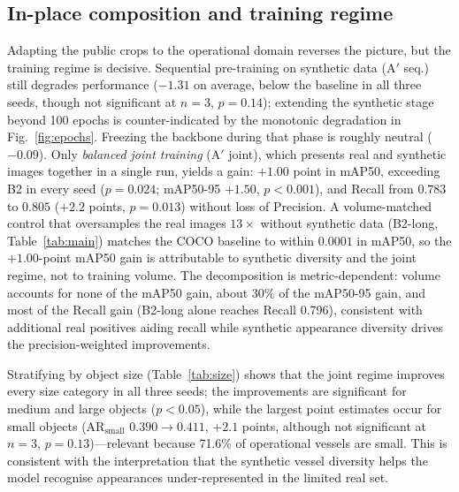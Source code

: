 \documentclass[10pt,conference]{IEEEtran}
\begin{document}
\subsection{In-place composition and training regime}
\label{subsec:inplace}
Adapting the public crops to the operational domain reverses the picture, but the training regime is decisive. Sequential pre-training on synthetic data (A$'$ seq.) still degrades performance ($-1.31$ on average, below the baseline in all three seeds, though not significant at $n{=}3$, $p=0.14$); extending the synthetic stage beyond 100 epochs is counter-indicated by the monotonic degradation in Fig.~\ref{fig:epochs}. Freezing the backbone during that phase is roughly neutral ($-0.09$). Only \emph{balanced joint training} (A$'$ joint), which presents real and synthetic images together in a single run, yields a gain: $+1.00$ point in mAP50, exceeding B2 in every seed ($p=0.024$; mAP50-95 $+1.50$, $p<0.001$), and Recall from $0.783$ to $0.805$ ($+2.2$ points, $p=0.013$) without loss of Precision. 
A volume-matched control that oversamples the real images $13\times$ without synthetic data (B2-long, Table~\ref{tab:main}) matches the COCO baseline to within $0.0001$ in mAP50, so the $+1.00$-point mAP50 gain is attributable to synthetic diversity and the joint regime, not to training volume. The decomposition is metric-dependent: volume accounts for none of the mAP50 gain, about 30\% of the mAP50-95 gain, and most of the Recall gain (B2-long alone reaches Recall 0.796), consistent with additional real positives aiding recall while synthetic appearance diversity drives the precision-weighted improvements.

Stratifying by object size (Table~\ref{tab:size}) shows that the joint regime
improves every size category in all three seeds; the improvements are significant
for medium and large objects ($p<0.05$), while the largest point estimates occur
for small objects ($\text{AR}_\text{small}$ $0.390\!\rightarrow\!0.411$, $+2.1$
points, although not significant at $n{=}3$, $p=0.13$)---relevant because
71.6\% of operational vessels are small. This is consistent with the
interpretation that the synthetic vessel diversity helps the model recognise
appearances under-represented in the limited real set.
\end{document}

